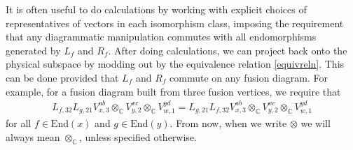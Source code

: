 \documentclass[12pt,a4paper]{article}
\newcommand{\tp}{\otimes}
\newcommand{\cc}{\mathbb{C}}
\begin{document}
It is often useful to do calculations %
by working with explicit choices of representatives of vectors in each isomorphism class, imposing the requirement that any diagrammatic manipulation commutes with all endomorphisms generated by $L_f$ and $R_f$. 
After doing calculations, we can project back onto the physical subspace by modding out by the equivalence relation \eqref{equivreln}. 
This can be done provided that $L_f$ and $R_f$ commute on any fusion diagram. For example, for a fusion diagram built from three fusion vertices, we require that
\begin{align}
L_{f, 32}L_{g,21} V^{ab}_{x,3} \tp_{\mathbb{C}} V^{xc}_{y,2} \tp_{\mathbb{C}} V^{yd}_{w,1} = L_{g,21} L_{f, 32} V^{ab}_{x,3} \tp_{\mathbb{C}} V^{xc}_{y,2} \tp_{\mathbb{C}} V^{yd}_{w,1} 
\end{align}
for all $f \in \text{End}(x)$ and $g \in \text{End}(y)$. 
From now, when we write $\tp$ we will always mean $\tp_\cc$, unless specified otherwise.



\end{document}
